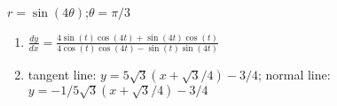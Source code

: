 {$r=\sin(4\theta)$;\quad $\theta = \pi/3$}
{\begin{enumerate}
	\item $\frac{dy}{dx} = \frac{4 \sin (t) \cos (4 t)+\sin (4 t) \cos (t)}{4 \cos (t) \cos
   (4 t)-\sin (t) \sin (4 t)}$
	\item	tangent line: $y=5\sqrt{3}(x+\sqrt{3}/4)-3/4$; normal line: $y=-1/5\sqrt{3}(x+\sqrt{3}/4)-3/4$
\end{enumerate}}
